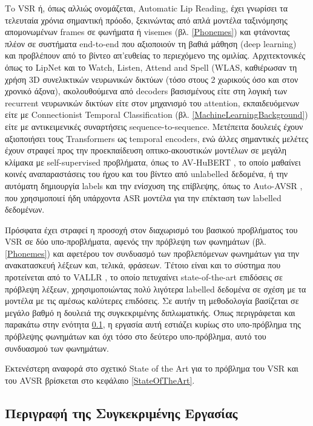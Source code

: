 Τo VSR ή, όπως αλλιώς ονομάζεται, Automatic Lip Reading, έχει γνωρίσει τα τελευταία χρόνια σημαντική πρόοδο, ξεκινώντας από απλά μοντέλα ταξινόμησης απομονωμένων frames σε φωνήματα ή visemes (βλ. \ref{Phonemes}) και φτάνοντας πλέον σε συστήματα end-to-end που αξιοποιούν τη βαθιά μάθηση (deep learning) και προβλέπουν από το βίντεο απ'ευθείας το περιεχόμενο της ομιλίας. Αρχιτεκτονικές όπως το LipNet \cite{assael2016lipnetendtoendsentencelevellipreading} και το Watch, Listen, Attend and Spell (WLAS, \cite{Chung17} καθιέρωσαν τη χρήση 3D συνελικτικών νευρωνικών δικτύων (τόσο στους 2 χωρικούς όσο και στον χρονικό άξονα), ακολουθούμενα από decoders βασισμένους είτε στη λογική των recurrent νευρωνικών δικτύων είτε στον μηχανισμό του attention, εκπαιδευόμενων είτε με Connectionist Temporal Classification (βλ. \ref{MachineLearningBackground}) είτε με αντικειμενικές συναρτήσεις sequence-to-sequence. Μετέπειτα δουλειές έχουν αξιοποιήσει τους Transformers ως temporal encoders, ενώ άλλες σημαντικές μελέτες έχουν στραφεί προς την προεκπαίδευση οπτικο-ακουστικών μοντέλων σε μεγάλη κλίμακα με self-supervised προβλήματα, όπως το AV-HuBERT \cite{shi2022learningaudiovisualspeechrepresentation}, το οποίο μαθαίνει κοινές αναπαραστάσεις του ήχου και του βίντεο από unlabelled δεδομένα, ή την αυτόματη δημιουργία labels και την ενίσχυση της επίβλεψης, όπως το Auto-AVSR \cite{Ma_2023}, που χρησιμοποιεί ήδη υπάρχοντα ASR μοντέλα για την επέκταση των labelled δεδομένων.

Πρόσφατα έχει στραφεί η προσοχή στον διαχωρισμό του βασικού προβλήματος του VSR σε δύο υπο-προβλήματα, αφενός την πρόβλεψη των φωνημάτων (βλ. \ref{Phonemes}) και αφετέρου τον συνδυασμό των προβλεπόμενων φωνημάτων για την ανακατασκευή λέξεων και, τελικά, φράσεων. Τέτοιο είναι και το σύστημα που προτείνεται από το VALLR \cite{thomas2026vallrvisualasrlanguage}, το οποίο πετυχαίνει state-of-the-art επιδόσεις σε πρόβλεψη λέξεων, χρησιμοποιώντας πολύ λιγότερα labelled δεδομένα σε σχέση με τα μοντέλα με τις αμέσως καλύτερες επιδόσεις. Σε αυτήν τη μεθοδολογία βασίζεται σε μεγάλο βαθμό η δουλειά της συγκεκριμένης διπλωματικής. Όπως περιγράφεται και παρακάτω στην ενότητα \ref{ThisWork}, η εργασία αυτή εστιάζει κυρίως στο υπο-πρόβλημα της πρόβλεψης φωνημάτων και όχι τόσο στο δεύτερο υπο-πρόβλημα, αυτό του συνδυασμού των φωνημάτων. 

Εκτενέστερη αναφορά στο σχετικό State of the Art για το πρόβλημα του VSR και του AVSR βρίσκεται στο κεφάλαιο \ref{StateOfTheArt}.

\subsection{Περιγραφή της Συγκεκριμένης Εργασίας}
\label{ThisWork}

